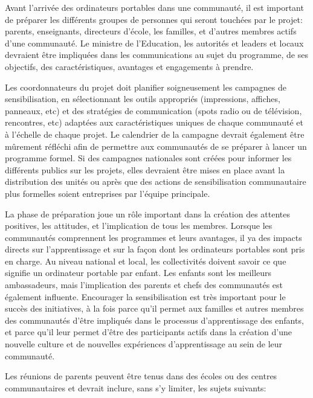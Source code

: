 \documentclass[11pt]{article}
\begin{document}

Avant l'arrivée des ordinateurs portables dans une communauté, il est
important de préparer les différents groupes de personnes qui seront
touchées par le projet: parents, enseignants, directeurs d'école, les
familles, et d'autres membres actifs d'une communauté. Le ministre de
l'Education, les autorités et leaders et locaux devraient être impliquées
dans les communications au sujet du programme, de ses objectifs, des
caractéristiques, avantages et engagements à prendre.

Les coordonnateurs du projet doit planifier soigneusement les campagnes de
sensibilisation, en sélectionnant les outils appropriés (impressions,
affiches, panneaux, etc) et des stratégies de communication (spots radio ou
de télévision, rencontres, etc) adaptées aux caractéristiques uniques de
chaque communauté et à l'échelle de chaque projet. Le calendrier de la
campagne devrait également être mûrement réfléchi afin de permettre aux
communautés de se préparer à lancer un programme formel. Si des campagnes
nationales sont créées pour informer les différents publics sur les
projets, elles devraient être mises en place avant la distribution des
unités ou après que des actions de sensibilisation communautaire plus
formelles soient entreprises par l'équipe principale.

La phase de préparation joue un rôle important dans la création des
attentes positives, les attitudes, et l'implication de tous les
membres. Lorsque les communautés comprennent les programmes et leurs
avantages, il ya des impacts directs sur l'apprentissage et sur la façon
dont les ordinateurs portables sont pris en charge. Au niveau national et
local, les collectivités doivent savoir ce que signifie un ordinateur
portable par enfant. Les enfants sont les meilleurs ambassadeurs, mais
l'implication des parents et chefs des communautés est également
influente. Encourager la sensibilisation est très important pour le succès
des initiatives, à la fois parce qu'il permet aux familles et autres
membres des communautés d'être impliqués dans le processus d'apprentissage
des enfants, et parce qu'il leur permet d'être des participants actifs dans
la création d'une nouvelle culture et de nouvelles expériences
d'apprentissage au sein de leur communauté.

Les réunions de parents peuvent être tenus dans des écoles ou des centres
communautaires et devrait inclure, sans s'y limiter, les sujets suivants:
\end{document}
